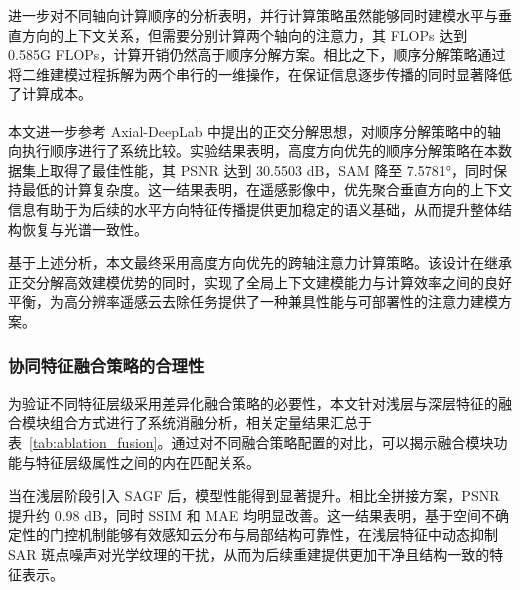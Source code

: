 进一步对不同轴向计算顺序的分析表明，并行计算策略虽然能够同时建模水平与垂直方向的上下文关系，但需要分别计算两个轴向的注意力，其 FLOPs 达到 0.585G FLOPs，计算开销仍然高于顺序分解方案。相比之下，顺序分解策略通过将二维建模过程拆解为两个串行的一维操作，在保证信息逐步传播的同时显著降低了计算成本。

本文进一步参考 Axial-DeepLab\textsuperscript{\cite{wang2020axial}} 中提出的正交分解思想，对顺序分解策略中的轴向执行顺序进行了系统比较。实验结果表明，高度方向优先的顺序分解策略在本数据集上取得了最佳性能，其 PSNR 达到 30.5503 dB，SAM 降至 7.5781°，同时保持最低的计算复杂度。这一结果表明，在遥感影像中，优先聚合垂直方向的上下文信息有助于为后续的水平方向特征传播提供更加稳定的语义基础，从而提升整体结构恢复与光谱一致性。

基于上述分析，本文最终采用高度方向优先的跨轴注意力计算策略。该设计在继承正交分解高效建模优势的同时，实现了全局上下文建模能力与计算效率之间的良好平衡，为高分辨率遥感云去除任务提供了一种兼具性能与可部署性的注意力建模方案。

\subsubsection{协同特征融合策略的合理性}

为验证不同特征层级采用差异化融合策略的必要性，本文针对浅层与深层特征的融合模块组合方式进行了系统消融分析，相关定量结果汇总于表~\ref{tab:ablation_fusion}。通过对不同融合策略配置的对比，可以揭示融合模块功能与特征层级属性之间的内在匹配关系。

当在浅层阶段引入 SAGF 后，模型性能得到显著提升。相比全拼接方案，PSNR 提升约 0.98 dB，同时 SSIM 和 MAE 均明显改善。这一结果表明，基于空间不确定性的门控机制能够有效感知云分布与局部结构可靠性，在浅层特征中动态抑制 SAR 斑点噪声对光学纹理的干扰，从而为后续重建提供更加干净且结构一致的特征表示。

